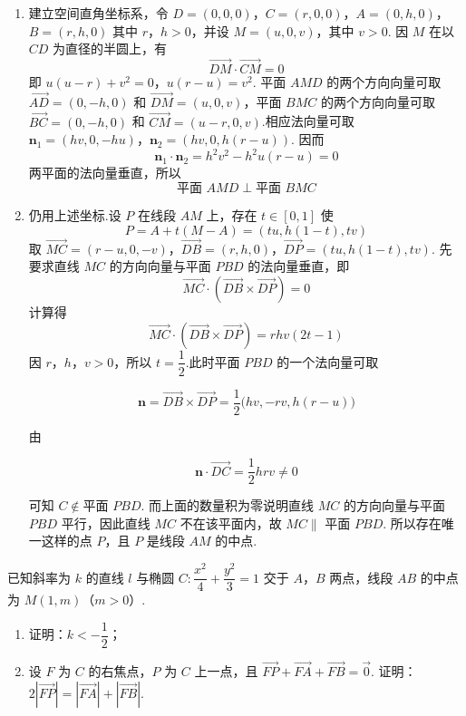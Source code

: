 \begin{solution}
\begin{enumerate}
    \item 建立空间直角坐标系，令
\(D=(0,0,0)\)，\(C=(r,0,0)\)，\(A=(0,h,0)\)，\(B=(r,h,0)\)
    其中 \(r\)，\(h>0\)，并设 \(M=(u,0,v)\)，其中 \(v>0\). 因 \(M\) 在以 \(CD\) 为直径的半圆上，有
    \[
    \overrightarrow{DM}\cdot\overrightarrow{CM}=0
    \]
    即
\(u(u-r)+v^2=0\)，\(u(r-u)=v^2\).
    平面 \(AMD\) 的两个方向向量可取 \(\overrightarrow{AD}=(0,-h,0)\) 和 \(\overrightarrow{DM}=(u,0,v)\)，平面 \(BMC\) 的两个方向向量可取 \(\overrightarrow{BC}=(0,-h,0)\) 和 \(\overrightarrow{CM}=(u-r,0,v)\).相应法向量可取
\(\mathbf n_1=(hv,0,-hu)\)，\(\mathbf n_2=(hv,0,h(r-u))\).
    因而
    \[
    \mathbf n_1\cdot\mathbf n_2
    =h^2v^2-h^2u(r-u)=0
    \]
    两平面的法向量垂直，所以
    \[
    \text{平面 }AMD\perp\text{平面 }BMC
    \]

    \item 仍用上述坐标.设 \(P\) 在线段 \(AM\) 上，存在 \(t\in[0,1]\) 使
    \[
    P=A+t(M-A)=(tu,h(1-t),tv)
    \]
    取
\(\overrightarrow{MC}=(r-u,0,-v)\)，\(\overrightarrow{DB}=(r,h,0)\)，\(\overrightarrow{DP}=(tu,h(1-t),tv)\).
先要求直线 \(MC\) 的方向向量与平面 \(PBD\) 的法向量垂直，即
    \[
    \overrightarrow{MC}\cdot
    \left(\overrightarrow{DB}\times\overrightarrow{DP}\right)=0
    \]
    计算得
    \[
    \overrightarrow{MC}\cdot
    \left(\overrightarrow{DB}\times\overrightarrow{DP}\right)
    =rhv(2t-1)
    \]
因 \(r\)，\(h\)，\(v>0\)，所以 \(t=\dfrac12\).此时平面 \(PBD\) 的一个法向量可取

\[
\mathbf n=\overrightarrow{DB}\times\overrightarrow{DP}
=\frac12\bigl(hv,-rv,h(r-u)\bigr)
\]

由

\[
\mathbf n\cdot\overrightarrow{DC}=\frac12 hrv\ne0
\]

可知 \(C\notin\text{平面 }PBD\). 而上面的数量积为零说明直线 \(MC\) 的方向向量与平面 \(PBD\) 平行，因此直线 \(MC\) 不在该平面内，故 \(MC\parallel\) 平面 \(PBD\). 所以存在唯一这样的点 \(P\)，且 \(P\) 是线段 \(AM\) 的中点.
\end{enumerate}
\end{solution}

\begin{problem}
已知斜率为 \(k\) 的直线 \(l\) 与椭圆 \(C:\dfrac{x^2}{4}+\dfrac{y^2}{3}=1\) 交于 \(A\)，\(B\) 两点，线段 \(AB\) 的中点为 \(M(1,m)\)（\(m>0\)）.

\begin{enumerate}
    \item 证明：\(k<-\dfrac12\)；
    \item 设 \(F\) 为 \(C\) 的右焦点，\(P\) 为 \(C\) 上一点，且 \(\overrightarrow{FP}+\overrightarrow{FA}+\overrightarrow{FB}=\overrightarrow{0}\). 证明：\(2\left|\overrightarrow{FP}\right|=\left|\overrightarrow{FA}\right|+\left|\overrightarrow{FB}\right|\).
\end{enumerate}
\end{problem}

